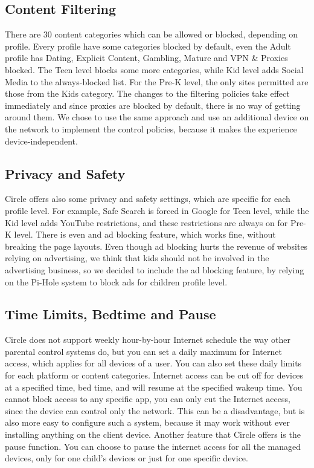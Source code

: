 \subsection{Content Filtering}

There are 30 content categories which can be allowed or blocked, depending on profile. Every profile have some categories blocked by default, even the Adult profile has Dating, Explicit Content, Gambling, Mature and VPN \& Proxies blocked. The Teen level blocks some more categories, while Kid level adds Social Media to the always-blocked list. For the Pre-K level, the only sites permitted are those from the Kids category. The changes to the filtering policies take effect immediately and since proxies are blocked by default, there is no way of getting around them. We chose to use the same approach and use an additional device on the network to implement the control policies, because it makes the experience device-independent.

\subsection{Privacy and Safety}

Circle offers also some privacy and safety settings, which are specific for each profile level. For example, Safe Search is forced in Google for Teen level, while the Kid level adds YouTube restrictions, and these restrictions are always on for Pre-K level.
There is even and ad blocking feature, which works fine, without breaking the page layouts. Even though ad blocking hurts the revenue of websites relying on advertising, we think that kids should not be involved in the advertising business, so we decided to include the ad blocking feature, by relying on the Pi-Hole system to block ads for children profile level.

\subsection{Time Limits, Bedtime and Pause}

Circle does not support weekly hour-by-hour Internet schedule the way other parental control systems do, but you can set a daily maximum for Internet access, which applies for all devices of a user. You can also set these daily limits for each platform or content categories. Internet access can be cut off for devices at a specified time, bed time, and will resume at the specified wakeup time. You cannot block access to any specific app, you can only cut the Internet access, since the device can control only the network. This can be a disadvantage, but is also more easy to configure such a system, because it may work without ever installing anything on the client device. Another feature that Circle offers is the pause function. You can choose to pause the internet access for all the managed devices, only for one child's devices or just for one specific device.

